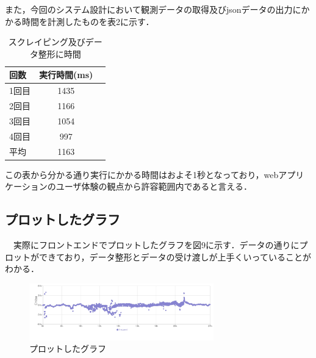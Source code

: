 また，今回のシステム設計において観測データの取得及びjsonデータの出力にかかる時間を計測したものを表2に示す．\cite{shu_sotsuken}\\
\begin{table}[hb]
	\caption{スクレイピング及びデータ整形に時間}
	\centering
	\begin{tabular}{lcr}
		\hline
		回数  & 実行時間(ms) \\
		\hline \hline
		1回目 & 1435     \\
		2回目 & 1166     \\
		3回目 & 1054     \\
		4回目 & 997      \\
		\hline
		平均  & 1163
	\end{tabular}
\end{table}
この表から分かる通り実行にかかる時間はおよそ1秒となっており，webアプリケーションのユーザ体験の観点から許容範囲内であると言える．


 
\subsection{プロットしたグラフ}
　実際にフロントエンドでプロットしたグラフを図9に示す．データの通りにプロットができており，データ整形とデータの受け渡しが上手くいっていることがわかる．\\
 \begin{figure}[ht]
   \centering
   \includegraphics[width=80mm]{fig/graph.png}
      \caption{プロットしたグラフ}
 \end{figure}\\


